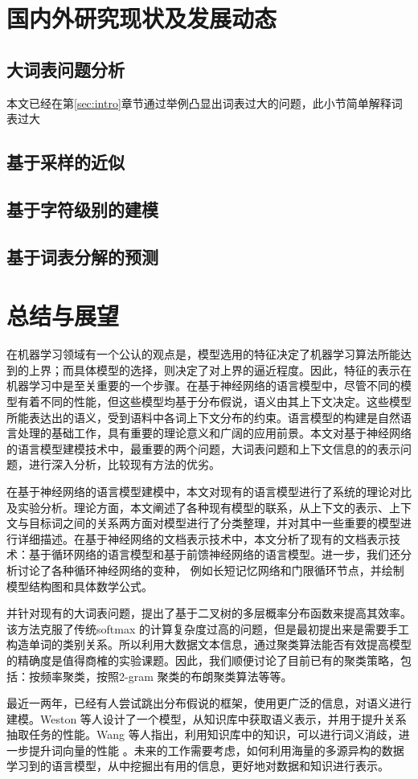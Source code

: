\documentclass[12pt,a4paper]{article}
\begin{document}
\section{国内外研究现状及发展动态}
\subsection{大词表问题分析}
本文已经在第\ref{sec:intro}章节通过举例凸显出词表过大的问题，此小节简单解释词表过大
\subsection{基于采样的近似}

\subsection{基于字符级别的建模}

\subsection{基于词表分解的预测}





\section{总结与展望}
在机器学习领域有一个公认的观点是，模型选用的特征决定了机器学习算法所能达到的上界；而具体模型的选择，则决定了对上界的逼近程度。因此，特征的表示在机器学习中是至关重要的一个步骤。在基于神经网络的语言模型中，尽管不同的模型有着不同的性能，但这些模型均基于分布假说，语义由其上下文决定。这些模型所能表达出的语义，受到语料中各词上下文分布的约束。语言模型的构建是自然语言处理的基础工作，具有重要的理论意义和广阔的应用前景。本文对基于神经网络的语言模型建模技术中，最重要的两个问题，大词表问题和上下文信息的的表示问题，进行深入分析，比较现有方法的优劣。

在基于神经网络的语言模型建模中，本文对现有的语言模型进行了系统的理论对比及实验分析。理论方面，本文阐述了各种现有模型的联系，从上下文的表示、上下文与目标词之间的关系两方面对模型进行了分类整理，并对其中一些重要的模型进行详细描述。在基于神经网络的文档表示技术中，本文分析了现有的文档表示技术：基于循环网络的语言模型和基于前馈神经网络的语言模型。进一步，我们还分析讨论了各种循环神经网络的变种， 例如长短记忆网络和门限循环节点，并绘制模型结构图和具体数学公式。

并针对现有的大词表问题，提出了基于二叉树的多层概率分布函数来提高其效率。该方法克服了传统softmax 的计算复杂度过高的问题，但是最初提出来是需要手工构造单词的类别关系。所以利用大数据文本信息，通过聚类算法能否有效提高模型的精确度是值得商榷的实验课题。因此，我们顺便讨论了目前已有的聚类策略，包括：按频率聚类，按照2-gram 聚类的布朗聚类算法等等。


最近一两年，已经有人尝试跳出分布假说的框架，使用更广泛的信息，对语义进行建模。Weston 等人设计了一个模型，从知识库中获取语义表示，并用于提升关系抽取任务的性能\cite{DBLP:conf/emnlp/WestonBYU13}。Wang 等人指出，利用知识库中的知识，可以进行词义消歧，进一步提升词向量的性能 \cite{DBLP:conf/emnlp/2014}。未来的工作需要考虑，如何利用海量的多源异构的数据学习到的语言模型，从中挖掘出有用的信息，更好地对数据和知识进行表示。
\newpage
{}

\end{document}
